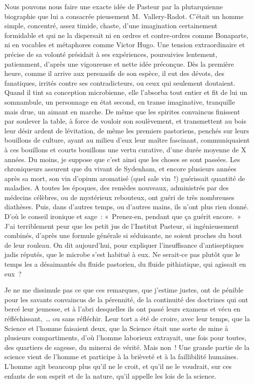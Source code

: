 \documentclass[french,twoside]{book} %
\begin{document}
Nous pouvons nous faire une exacte idée de Pasteur par la plutarquienne biographie que lui a consacrée pieusement M. Vallery-Radot. C’était un homme simple, concentré, assez timide, chaste, d’une imagination certainement formidable et qui ne la dispersait ni en ordres et contre-ordres comme Bonaparte, ni en vocables et métaphores comme Victor Hugo. Une tension extraordinaire et précise de sa volonté présidait à ses expériences, poursuivies lentement, patiemment, d’après une vigoureuse et nette idée préconçue. Dès la première heure, comme il arrive aux persuasifs de son espèce, il eut des dévots, des fanatiques, irrités contre ses contradicteurs, ou ceux qui seulement doutaient. Quand il tint sa conception microbienne, elle l’absorba tout entier et fit de lui un somnambule, un personnage en état second, en transe imaginative, tranquille mais drue, un aimant en marche. De même que les spirites convaincus finissent par soulever la table, à force de vouloir son soulèvement, et transmettent au bois leur désir ardent de lévitation, de même les premiers pastoriens, penchés sur leurs bouillons de culture, ayant au milieu d’eux leur maître fascinant, communiquaient à ces bouillons et courts bouillons une vertu curative, d’une durée moyenne de X années. Du moins, je suppose que c’est ainsi que les choses se sont passées. Les chroniqueurs assurent que du vivant de Sydenham, et encore plusieurs années après sa mort, son vin d’opium aromatisé (quel sale vin !) guérissait quantité de maladies. A toutes les époques, des remèdes nouveaux, administrés par des médecins célèbres, ou de mystérieux rebouteux, ont guéri de très nombreuses diathèses. Puis, dans d’autres temps, ou d’autres mains, ils n’ont plus rien donné. D’où le conseil ironique et sage : « Prenez-en, pendant que ça guérit encore. » J’ai terriblement peur que les petit jus de l’Institut Pasteur, si ingénieusement combinés, d’après une formule générale si séduisante, ne soient proches du bout de leur rouleau. On dit aujourd’hui, pour expliquer l’insuffisance d’antiseptiques jadis réputés, que le microbe s’est habitué à eux. Ne serait-ce pas plutôt que le temps les a désaimantés du fluide pastorien, du fluide pithiatique, qui agissait en eux ?\par
Je ne me dissimule pas ce que ces remarques, que j’estime justes, ont de pénible pour les savants convaincus de la pérennité, de la continuité des doctrines qui ont bercé leur jeunesse, et à l’abri desquelles ils ont passé leurs examens et vécu en réfléchissant, … ou sans réfléchir. Leur tort a été de croire, avec leur temps, que la Science et l’homme faisaient deux, que la Science était une sorte de mine à plusieurs compartiments, d’où l’homme laborieux extrayait, une fois pour toutes, des quartiers de sagesse, du minerai de vérité. Mais non ! Une grande partie de la science vient de l’homme et participe à la brièveté et à la faillibilité humaines. L’homme agit beaucoup plus qu’il ne le croit, et qu’il ne le voudrait, sur ces enfants de son esprit et de la nature, qu’il appelle les lois de la science.\par
\end{document}
